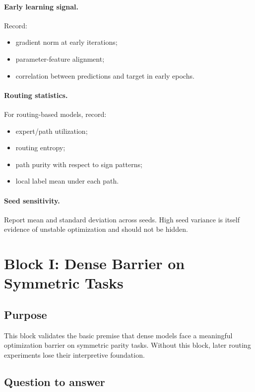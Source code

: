 \documentclass[11pt]{article}
\begin{document}
\paragraph{Early learning signal.}
Record:
\begin{itemize}[leftmargin=2em]
    \item gradient norm at early iterations;
    \item parameter-feature alignment;
    \item correlation between predictions and target in early epochs.
\end{itemize}

\paragraph{Routing statistics.}
For routing-based models, record:
\begin{itemize}[leftmargin=2em]
    \item expert/path utilization;
    \item routing entropy;
    \item path purity with respect to sign patterns;
    \item local label mean under each path.
\end{itemize}

\paragraph{Seed sensitivity.}
Report mean and standard deviation across seeds. High seed variance is itself evidence of unstable optimization and should not be hidden.

\section{Block I: Dense Barrier on Symmetric Tasks}

\subsection{Purpose}

This block validates the basic premise that dense models face a meaningful optimization barrier on symmetric parity tasks. Without this block, later routing experiments lose their interpretive foundation.

\subsection{Question to answer}
\end{document}
